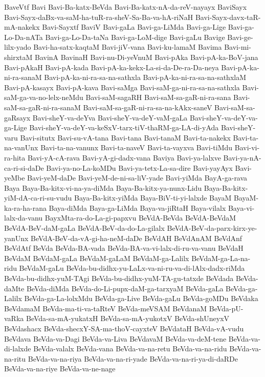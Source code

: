 {BaveVtf
Bavi
Bavi-Ba-katx-BeVda
Bavi-Ba-katx-nA-da-reV-nayayx
BaviSayx
Bavi-Sayx-daBx-va-saM-ha-tuR-ra-sheV-Sa-Ba-va-hA-riNaH
Bavi-Sayx-davx-taR-mA-nakekx
Bavi-Sayxtf
BaviV
Bavi-gaLa
Bavi-ga-LiMda
Bavi-ga-Lige
Bavi-ga-Lo-Da-nATa
Bavi-ga-Lo-Da-taNa
Bavi-ga-LoM-dige
Bavi-gaLu
Bavige
Bavi-ge-lilx-yado
Bavi-ha-satx-kaqtaM
Bavi-jiV-vana
Bavi-ku-lamaM
Bavima
Bavi-mi-shirxtaM
BavinA
BavinaH
Bavi-nu-Di-yeVnuM
Bavi-pAka
Bavi-pA-ka-BoV-jana
Bavi-pAkaH
Bavi-pA-kada
Bavi-pA-ka-kekx-La-si-da-De-ra-Da-neya
Bavi-pA-ka-ni-ra-sanaM
Bavi-pA-ka-ni-ra-sa-na-sathxla
Bavi-pA-ka-ni-ra-sa-na-sathxlaM
Bavi-pA-kasayx
Bavi-pA-kava
Bavi-saMga
Bavi-saM-ga-ni-ra-sa-na-sathxla
Bavi-saM-ga-va-no-lelx-neMdu
Bavi-saM-sagaRH
Bavi-saM-sa-gaR-ni-ra-sana
Bavi-saM-sa-gaR-ni-ra-sanaM
Bavi-saM-sa-gaR-ni-ra-sa-na-kAkx-saneV
Bavi-saM-sa-gaRsayx
Bavi-sheY-va-deYva
Bavi-sheY-va-deY-vaM-gaLa
Bavi-sheY-va-deY-va-ga-Lige
Bavi-sheY-va-deY-va-keSxV-tarx-tiV-thaRM-ga-LA-di-yAda
Bavi-sheY-varu
Bavi-situtx
Bavi-su-vA-tana
Bavi-tana
Bavi-tanaM
Bavi-ta-nakekx
Bavi-ta-na-vanUnx
Bavi-ta-na-vanunx
Bavi-ta-naveV
Bavi-ta-vayxva
Bavi-tiMdu
Bavi-vi-ra-hita
Bavi-yA-cA-rava
Bavi-yA-gi-dadx-vana
Baviya
Bavi-ya-lalxve
Bavi-ya-nA-ca-ri-si-daDe
Bavi-ya-no-La-koMDu
Bavi-ya-tetx-La-sa-dire
Bavi-yayAyx
Bavi-yeMbe
Bavi-yeM-daDe
Bavi-yeM-de-ni-sa-liV-yade
Bavi-yiMda
BayA-ga-rava
Baya
Baya-Ba-kitx-vi-na-ya-diMda
Baya-Ba-kitx-ya-nunx-Lidu
Baya-Ba-kitx-yiM-dA-ca-ri-su-vudu
Baya-Ba-kitx-yiMda
Baya-BiV-ti-yi-lalxde
BayaM
BayaM-ka-ra-ha-rana
Baya-diMda
Baya-ga-LiMda
Baya-va-jiRtaH
Baya-vilalx
Baya-vi-lalx-da-vanu
BayxMta-ra-do-La-gi-papxvu
BeVdA-BeVda
BeVdA-BeVdaM
BeVdA-BeV-daM-gaLa
BeVdA-BeV-da-do-La-gilalx
BeVdA-BeV-da-parx-kirx-ye-yanUnx
BeVdA-BeV-da-vA-gi-ha-neM-daDe
BeVdAH
BeVdAnAM
BeVdAnf
BeVdAtf
BeVda
BeVda-BA-vada
BeVda-BA-va-vi-lalx-di-ru-va-vanu
BeVdaH
BeVdaM
BeVdaM-gaLa
BeVdaM-gaLaM
BeVdaM-ga-Lalilx
BeVdaM-ga-La-na-ridu
BeVdaM-gaLu
BeVda-bu-didhx-yu-LaLx-va-ni-ru-va-di-lAlx-dadx-riMda
BeVda-bu-didhx-yuM-TAgi
BeVda-bu-didhx-yuM-TA-gu-tatxde
BeVdada
BeVda-daMte
BeVda-diMda
BeVda-do-Li-pupx-daM-ga-tarxyaM
BeVda-gaLa
BeVda-ga-Lalilx
BeVda-ga-La-lolxMdu
BeVda-ga-Live
BeVda-gaLu
BeVda-goMDu
BeVdaka
BeVdamaM
BeVda-ma-ti-va-taRteV
BeVda-meVSAM
BeVdanaM
BeVda-pU-vaRka
BeVda-sa-mA-yukatxH
BeVda-sa-mA-yukotxV
BeVda-shUneyxV
BeVdashacx
BeVda-shecxY-SA-ma-thoV-cayxteV
BeVdataH
BeVda-vA-vudu
BeVdava
BeVda-va-Dagi
BeVda-va-Liva
BeVdavaM
BeVda-va-deM-tene
BeVda-va-di-lalxde
BeVda-valalx
BeVda-vana
BeVda-va-na-retu
BeVda-va-na-ridu
BeVda-va-na-ritu
BeVda-va-na-riya
BeVda-va-na-ri-yade
BeVda-va-na-ri-ya-di-daRDe
BeVda-va-na-riye
BeVda-va-ne-nage
}
